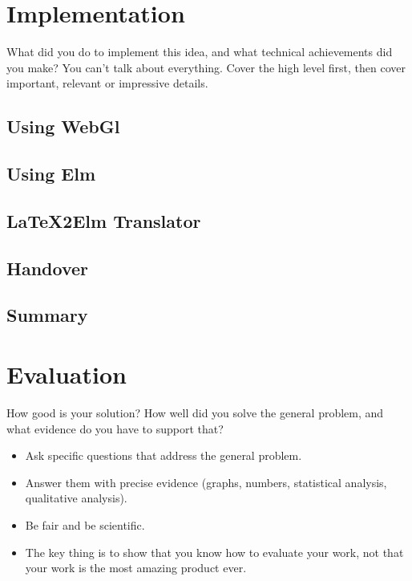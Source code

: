 \documentclass{l4proj}
\begin{document}
\chapter{Implementation}
What did you do to implement this idea, and what technical achievements did you make? You can't talk about everything. Cover the high level first, then cover important, relevant or impressive details.







\section{Using WebGl}

\section{Using Elm}

\section{LaTeX2Elm Translator}

\section{Handover}

\section{Summary}


\chapter{Evaluation} 
How good is your solution? How well did you solve the general problem, and what evidence do you have to support that?


\begin{itemize}
    \item
        Ask specific questions that address the general problem.
    \item
        Answer them with precise evidence (graphs, numbers, statistical
        analysis, qualitative analysis).
    \item
        Be fair and be scientific.
    \item
        The key thing is to show that you know how to evaluate your work, not
        that your work is the most amazing product ever.
\end{itemize}
\end{document}
